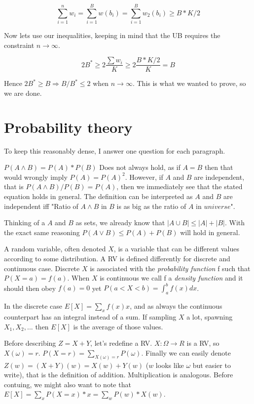 \documentclass[a4paper,11pt]{article}
\begin{document}
\[
 \sum_{i=1}^{n} w_i = \sum_{i=1}^{B} w({b_i}) = \sum_{i=1}^{B} w_2({b_i}) \geq B*K/2
\]

Now lets use our inequalities, keeping in mind that the UB requires the
constraint $n \to \infty$.

\[
 2B^* \geq 2 \frac{\sum w_i}{K} \geq 2 \frac{B*K/2}{K} = B
\]

Hence $2B^* \geq B \Rightarrow B/B^* \leq 2 $ when $n \to \infty$.
This is what we wanted to prove, so we are done.


\section{Probability theory}
To keep this reasonably dense, I answer one question for each paragraph.

$P(A \wedge B) = P(A) * P(B)$ Does not always hold, as if $A=B$ then that would
wrongly imply $P(A) = P(A)^2$. However, if $A$ and $B$ are
independent, that is $P(A \wedge B)/P(B) = P(A)$, then we immediately see
that the stated equation holds in general. The definition can be interpreted
as $A$ and $B$ are independent iff
"Ratio of $A \wedge B$ in $B$ is as big as the ratio of $A$ in $universe$".

Thinking of a $A$ and $B$ as sets, we already know that 
$|A \cup B| \leq |A| + |B|$. With the exact same reasoning
$P(A \vee B) \leq P(A) + P(B)$ will hold in general.

A random variable, often denoted $X$, is a variable that can be
different values according to some distribution.
A RV is defined differently for discrete and continuous case.
Discrete $X$ is associated with the \emph{probability function} f
such that $P(X = a) = f(a)$. When $X$ is continuous we call f a
\emph{density function} and it should then obey $f(a) = 0$ yet
$P(a < X < b) = \int_a^b f(x)dx$.

In the discrete case $E[X] = \sum_x f(x)x$, and as always the continuous
counterpart has an integral instead of a sum. If sampling $X$ a lot,
spawning $X_1, X_2, ...$ then $E[X]$ is the average of those values.

Before describing $Z = X + Y$, let's redefine a RV. $X : \Omega \to R$
is a RV, so $X(\omega) = r$. $P(X = r) = \sum_{X(\omega)=r} P(\omega)$.
Finally we can easily denote $Z(w) = (X + Y)(w) = X(w) + Y(w)$
($w$ looks like $\omega$ but easier to write),
that is the definition of
addition. Multiplication is analogous.
Before contuing, we might also want to note that
$E[X] = \sum_x P(X = x)*x  = \sum_w P(w)*X(w)$.
\end{document}

